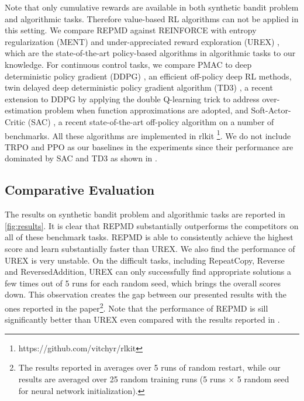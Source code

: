 Note that only cumulative rewards are available in both synthetic bandit problem and algorithmic tasks. Therefore value-based RL algorithms can not be applied in this setting. We compare REPMD against REINFORCE with entropy regularization (MENT) \citep{williams1992simple} and under-appreciated reward exploration (UREX) \citep{nachum2017improving}, which are the state-of-the-art policy-based algorithms in algorithmic tasks to our knowledge. For continuous control tasks, we compare PMAC to deep deterministic policy gradient (DDPG) \citep{lillicrap2015continuous}, an efficient off-policy deep RL methods, twin delayed deep deterministic policy gradient algorithm (TD3) \citep{fujimoto2018addressing}, a recent extension to DDPG by applying the double Q-learning trick to address over-estimation problem when function approximations are adopted, and Soft-Actor-Critic (SAC) \citep{haarnoja2018soft}, a recent state-of-the-art off-policy algorithm on a number of benchmarks. All these algorithms are implemented in rlkit \footnote{https://github.com/vitchyr/rlkit}. We do not include TRPO and PPO as our baselines in the experiments since their performance are dominated by SAC and TD3 as shown in \citep{haarnoja2018soft,fujimoto2018addressing}. 


\subsection{Comparative Evaluation}

The results on synthetic bandit problem and algorithmic tasks are reported in \cref{fig:results}. It is clear that REPMD substantially outperforms the competitors on all of these benchmark tasks. REPMD is able to consistently achieve the highest score and learn substantially faster than UREX. We also find the performance of UREX is very unstable. On the difficult tasks, including RepeatCopy, Reverse and ReversedAddition, UREX can only successfully find appropriate solutions a few times out of 5 runs for each random seed, which brings the overall scores down. This observation creates the gap between our presented results with the ones reported in the paper\footnote{The results reported in \citet{nachum2017improving} averages over 5 runs of random restart, while our results are averaged over 25 random training runs (5 runs $\times$ 5 random seed for neural network initialization). }. Note that the performance of REPMD is sill significantly better than UREX even compared with the results reported in \citet{nachum2017improving}. 


